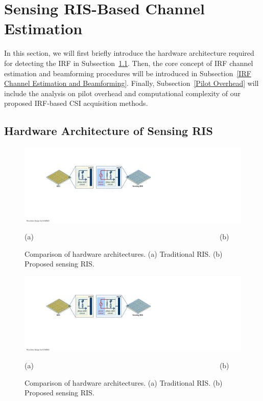 \documentclass[journal,twocolumn]{IEEEtran}
\theoremstyle{nonumberplain}
\begin{document}
\section{Sensing RIS-Based Channel Estimation}
\label{Sensing RIS-Based Channel Estimation}
In this section, we will first briefly introduce the hardware architecture required for detecting the \ac{IRF} in Subsection~\ref{Hardware Architecture of Sensing RIS}. Then, the core concept of IRF channel estimation and beamforming procedures will be introduced in Subsection~\ref{IRF Channel Estimation and Beamforming}. Finally, Subsection~\ref{Pilot Overhead} will include the analysis on pilot overhead and computational complexity of our proposed IRF-based CSI acquisition methods. 

\subsection{Hardware Architecture of Sensing RIS} \label{Hardware Architecture of Sensing RIS}
    \ifx\onecol\undefined
        \begin{figure}[!t]
            \centering
            \includegraphics[width=1\linewidth]{figures/hardware.pdf}
            \centerline{(a)~~~~~~~~~~~~~~~~~~~~~~~~~~~~~~~~~~~~~~~~~~~~~~~~~~~~(b)}
            \caption{Comparison of hardware architectures. (a) Traditional RIS. (b) Proposed sensing RIS.}
            \label{fig:hardware}
        \end{figure}
    \else 
        \begin{figure}[!t]
            \centering
            \includegraphics[width=\textwidth]{figures/hardware.pdf}
            \centerline{(a)~~~~~~~~~~~~~~~~~~~~~~~~~~~~~~~~~~~~~~~~~~~~~~~~~~~~(b)}
            \caption{Comparison of hardware architectures. (a) Traditional RIS. (b) Proposed sensing RIS.}
            \label{fig:hardware}
        \end{figure}
    \fi
    
\end{document}
